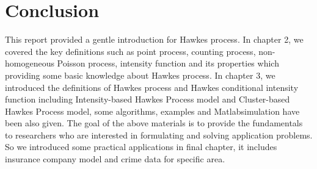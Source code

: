 \chapter{Conclusion}
This report provided a gentle introduction for Hawkes process. In chapter 2, we covered the key definitions such as point process, counting process, non-homogeneous Poisson process, intensity function and its properties which providing some basic knowledge about Hawkes process. In chapter 3, we introduced the definitions of Hawkes process and Hawkes conditional intensity function including Intensity-based Hawkes Process model and Cluster-based Hawkes Process model, some algorithms, examples and Matlab\textsuperscript \textregistered simulation have been also given. The goal of the above materials is to provide the fundamentals to researchers who are interested in formulating and solving application problems. So we introduced some practical applications in final chapter, it includes insurance company model and crime data for specific area.
